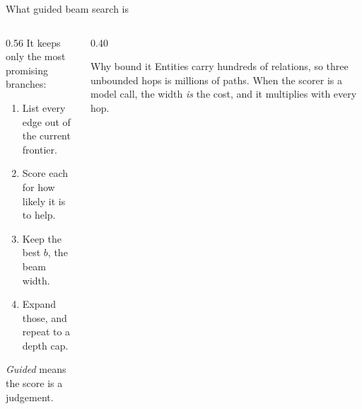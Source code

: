 \begin{frame}{What guided beam search is}
  \begin{columns}[T]
    \begin{column}{0.56\textwidth}
      \small
      It keeps only the most promising branches:
      \begin{enumerate}\itemsep2pt
        \item List every edge out of the current \alert{frontier}.
        \item \alert{Score} each for how likely it is to help.
        \item Keep the best $b$, the \alert{beam width}.
        \item Expand those, and repeat to a depth cap.
      \end{enumerate}
      \vspace{1mm}
      \emph{Guided} means the score is a judgement.
    \end{column}
    \begin{column}{0.40\textwidth}
      \begin{block}{Why bound it}
        \small\agrraggedright
        Entities carry hundreds of relations, so three unbounded hops is
        millions of paths. When the scorer is a \alert{model call}, the
        width \emph{is} the cost, and it multiplies with every hop.
      \end{block}
    \end{column}
  \end{columns}
\end{frame}

